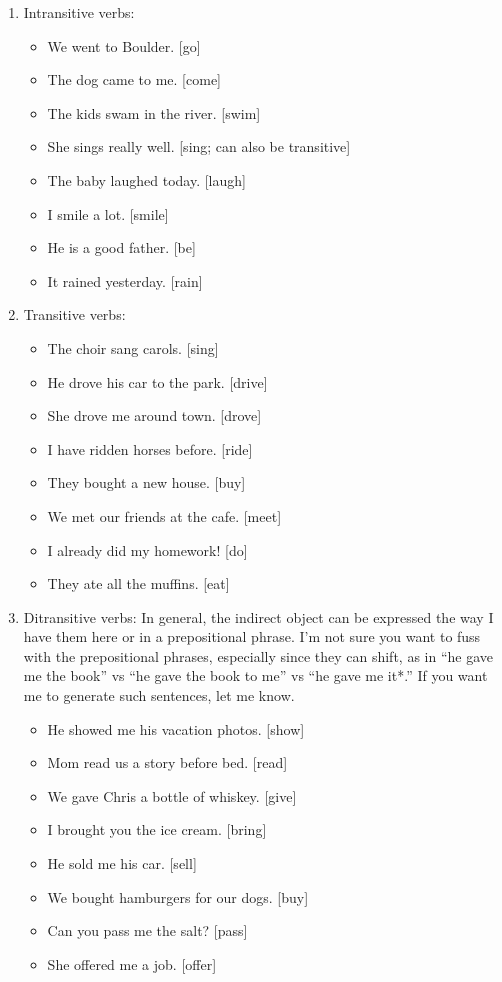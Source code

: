 \documentclass{article}
\begin{document}
\begin{enumerate}
\item Intransitive verbs:
\begin{itemize}
\item We went to Boulder. [go]
\item The dog came to me. [come]
\item The kids swam in the river. [swim]
\item She sings really well. [sing; can also be transitive]
\item The baby laughed today. [laugh]
\item I smile a lot. [smile]
\item He is a good father. [be]
\item It rained yesterday. [rain]
\end{itemize}

\item Transitive verbs:
\begin{itemize}
\item The choir sang carols. [sing]
\item He drove his car to the park. [drive]
\item She drove me around town. [drove]
\item I have ridden horses before. [ride]
\item They bought a new house. [buy]
\item We met our friends at the cafe. [meet]
\item I already did my homework! [do]
\item They ate all the muffins. [eat]

\end{itemize}

\item Ditransitive verbs:
In general, the indirect object can be expressed the way I have them here or in a prepositional phrase. I'm not sure you want to fuss with the prepositional phrases, especially since they can shift, as in ``he gave me the book'' vs ``he gave the book to me'' vs ``he gave me it*.'' If you want me to generate such sentences, let me know.

\begin{itemize}
\item He showed me his vacation photos. [show]
\item Mom read us a story before bed. [read]
\item We gave Chris a bottle of whiskey. [give]
\item I brought you the ice cream. [bring]
\item He sold me his car. [sell]
\item We bought hamburgers for our dogs. [buy]
\item Can you pass me the salt? [pass]
\item She offered me a job. [offer]
\end{itemize}


\end{enumerate}
\end{document}
